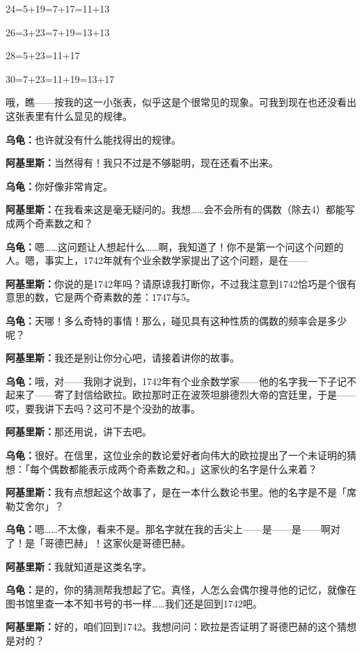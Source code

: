 \documentclass[
  12pt,
  twoside,
  openright,
  oldfontcommands,
]{memoir}
\newcommand{\dialogname}[1]{{\heifamily\bfseries #1}}
\begin{document}
24=5+19=7+17=11+13

26=3+23=7+19=13+13

28=5+23=11+17

30=7+23=11+19=13+17

哦，瞧------按我的这一小张表，似乎这是个很常见的现象。可我到现在也还没看出这张表里有什么显见的规律。

\dialogname{乌龟：}也许就没有什么能找得出的规律。

\dialogname{阿基里斯：}当然得有！我只不过是不够聪明，现在还看不出来。

\dialogname{乌龟：}你好像非常肯定。

\dialogname{阿基里斯：}在我看来这是毫无疑问的。我想\ldots\ldots 会不会所有的偶数（除去4）都能写成两个奇素数之和？

\dialogname{乌龟：}嗯\ldots\ldots 这问题让人想起什么\ldots\ldots 啊，我知道了！你不是第一个问这个问题的人。嗯，事实上，1742年就有个业余数学家提出了这个问题，是在------

\dialogname{阿基里斯：}你说的是1742年吗？请原谅我打断你，不过我注意到1742恰巧是个很有意思的数，它是两个奇素数的差：1747与5。

\dialogname{乌龟：}天哪！多么奇特的事情！那么，碰见具有这种性质的偶数的频率会是多少呢？

\dialogname{阿基里斯：}我还是别让你分心吧，请接着讲你的故事。

\dialogname{乌龟：}哦，对------我刚才说到，1742年有个业余数学家------他的名字我一下子记不起来了------寄了封信给欧拉。欧拉那时正在波茨坦腓德烈大帝的宫廷里，于是------哎，要我讲下去吗？这可不是个没劲的故事。

\dialogname{阿基里斯：}那还用说，讲下去吧。

\dialogname{乌龟：}很好。在信里，这位业余的数论爱好者向伟大的欧拉提出了一个未证明的猜想：「每个偶数都能表示成两个奇素数之和。」这家伙的名字是什么来着？

\dialogname{阿基里斯：}我有点想起这个故事了，是在一本什么数论书里。他的名字是不是「席勒艾舍尔」？

\dialogname{乌龟：}嗯\ldots\ldots 不太像，看来不是。那名字就在我的舌尖上------是------是------啊对了！是「哥德巴赫」！这家伙是哥德巴赫。

\dialogname{阿基里斯：}我就知道是这类名字。

\dialogname{乌龟：}是的，你的猜测帮我想起了它。真怪，人怎么会偶尔搜寻他的记忆，就像在图书馆里查一本不知书号的书一样\ldots\ldots 我们还是回到1742吧。

\dialogname{阿基里斯：}好的，咱们回到1742。我想问问：欧拉是否证明了哥德巴赫的这个猜想是对的？
\end{document}
